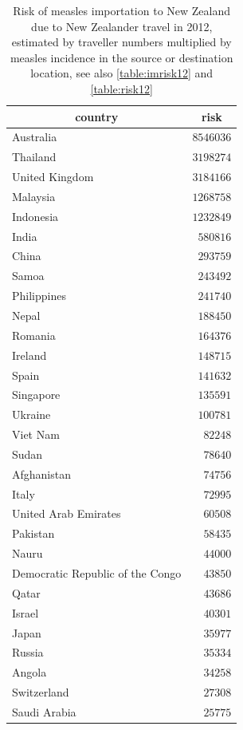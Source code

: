 \documentclass{article}
\begin{document}
\begin{table}
\caption{Risk of measles importation to New Zealand due to New Zealander travel in 2012, estimated by traveller numbers multiplied by measles incidence in the source or destination location, see also \autoref{table:imrisk12} and \autoref{table:risk12}}
\begin{center}
\begin{tabular}{lr}
\hline\hline
\multicolumn{1}{c}{country}&\multicolumn{1}{c}{risk}\tabularnewline
\hline
Australia&$8546036$\tabularnewline
Thailand&$3198274$\tabularnewline
United Kingdom&$3184166$\tabularnewline
Malaysia&$1268758$\tabularnewline
Indonesia&$1232849$\tabularnewline
India&$ 580816$\tabularnewline
China&$ 293759$\tabularnewline
Samoa&$ 243492$\tabularnewline
Philippines&$ 241740$\tabularnewline
Nepal&$ 188450$\tabularnewline
Romania&$ 164376$\tabularnewline
Ireland&$ 148715$\tabularnewline
Spain&$ 141632$\tabularnewline
Singapore&$ 135591$\tabularnewline
Ukraine&$ 100781$\tabularnewline
Viet Nam&$  82248$\tabularnewline
Sudan&$  78640$\tabularnewline
Afghanistan&$  74756$\tabularnewline
Italy&$  72995$\tabularnewline
United Arab Emirates&$  60508$\tabularnewline
Pakistan&$  58435$\tabularnewline
Nauru&$  44000$\tabularnewline
Democratic Republic of the Congo&$  43850$\tabularnewline
Qatar&$  43686$\tabularnewline
Israel&$  40301$\tabularnewline
Japan&$  35977$\tabularnewline
Russia&$  35334$\tabularnewline
Angola&$  34258$\tabularnewline
Switzerland&$  27308$\tabularnewline
Saudi Arabia&$  25775$\tabularnewline
\hline
\end{tabular}\end{center}\label{table:nzrisk12}
\end{table}
\end{document}
